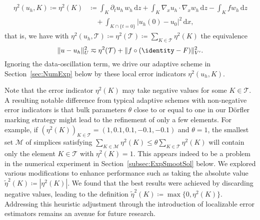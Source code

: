 \documentclass{amsart}
\providecommand{\tria}{\mathcal{T}}
\providecommand{\dx}{\,\mathrm{d}x}
\providecommand{\dz}{\,\mathrm{d}z}
\begin{document}
\begin{equation}\label{eq:LocErrorEst}
\begin{aligned}
\eta^2(u_h,K) \coloneqq \eta^2(K) &\coloneqq \int_K \partial_t u_h\, w_h \dz + \int_K \nabla_x u_h \cdot \nabla_x w_h\dz - \int_K fw_h \dz\\
&\quad  + \int_{K\cap \lbrace t = 0\rbrace } |u_h(0) - u_0|^2 \dx,
\end{aligned}
\end{equation}
that is, we have with $\eta^2(u_h,\tria) \coloneqq \eta^2(\tria)\coloneqq \sum_{K\in \tria}\eta^2(K)$ the equivalence
\begin{equation}\label{eq:defEta}
\lVert u - u_h \rVert_U^2 \eqsim \eta^2(\tria) + \lVert f \circ (\identity - F)\rVert^2_{V'}.
\end{equation}
Ignoring the data-oscillation term, we drive our adaptive scheme in Section~\ref{sec:NumExp} below by these local error indicators $\eta^2(u_h,K)$.
%
\begin{remark}\label{rem:NegErrorInd}
Note that the error indicator $\eta^2(K)$ may take negative values for some $K\in \tria$. A resulting notable difference from typical adaptive schemes with non-negative error indicators is that bulk parameters $\theta$ close to or equal to one in our D\"orfler marking strategy might lead to the refinement of only a few elements. For example, if $( \eta^2(K) )_{K \in \tria} = (1, 0.1, 0.1, -0.1, -0.1)$ and $\theta = 1$, the smallest set $\mathcal{M}$ of simplices satisfying $\sum_{K \in \mathcal{M}} \eta^2(K) \leq \theta \sum_{K \in \tria} \eta^2(K)$ will contain only the element $K \in \tria$ with $\eta^2(K) = 1$. This appears indeed to be a problem in the numerical experiment in Section~\ref{subsec:ExpSmootSol} below.
We explored various modifications to enhance performance such as taking the absolute value $\tilde{\eta}^2(K) \coloneqq |\eta^2(K)|$. We found that the best results were achieved by discarding negative values, leading to the definition $\tilde{\eta}^2(K) \coloneqq \max\lbrace 0, \eta^2(K)\rbrace$. Addressing this heuristic adjustment through the introduction of localizable error estimators remains an avenue for future research.
\end{remark}
%
\end{document}
